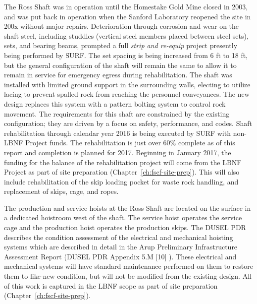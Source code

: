 The Ross Shaft was in operation until the Homestake Gold Mine closed in 2003, and was put back in operation when the Sanford Laboratory reopened
 the site in 200x  without major repairs.  Deterioration through corrosion and wear on the shaft steel, including studdles (vertical steel members placed between steel sets), sets, and bearing beams, prompted a full \textit{strip and re-equip} project presently being performed by  SURF. %
The set spacing is being increased from 6 ft to 18 ft, but the general configuration of the shaft will remain the same to allow it to remain in service for emergency egress during rehabilitation.  
The shaft was installed with limited ground support in the surrounding walls, electing to utilize lacing to prevent spalled rock from reaching the personnel conveyances. %
The new design replaces this system with a pattern bolting system to control rock movement. 
The requirements for this shaft are constrained by the existing configuration; they are driven by a focus on safety, performance, and codes.
%
Shaft rehabilitation through calendar year 2016 is being executed by SURF with non-LBNF Project funds. The rehabilitation is just over 60\% complete as of this report and completion is planned for 2017. Beginning in January 2017, the funding for the balance of the rehabilitation project will come from the LBNF Project as part of site preparation (Chapter~\ref{ch:fscf-site-prep}).  This will also include rehabilitation of the skip loading pocket for waste rock handling, and replacement of skips, cage, and ropes.

The production and service hoists at the Ross Shaft are located on the surface in a dedicated hoistroom west of the shaft. The service hoist operates the service cage and the production hoist operates the production skips. The DUSEL PDR  describes the condition assessment of the electrical and mechanical hoisting systems which are described in detail in the Arup Preliminary Infrastructure Assessment Report (DUSEL PDR Appendix 5.M [10] ). These electrical and mechanical systems will have standard maintenance performed on them to restore them to like-new condition, but will not be modified from the existing design. %
All of this work is captured in the LBNF scope as part of site preparation (Chapter~\ref{ch:fscf-site-prep}).


